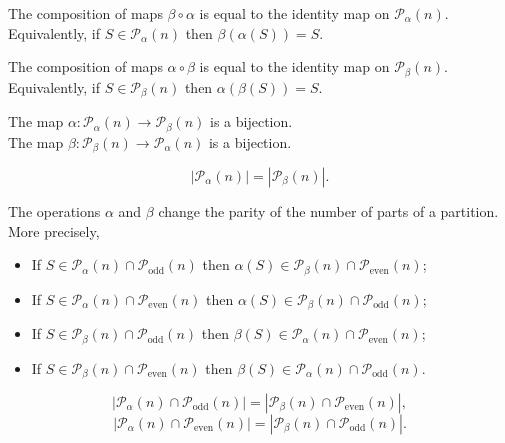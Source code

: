 \begin{lemma} \leanok
  The composition of maps $\beta\circ\alpha$ is equal to the identity map on  $\mathcal{P}_\alpha(n)$. Equivalently, if $S\in \mathcal{P}_\alpha(n)$ then $\beta(\alpha(S))=S$.
\end{lemma}

\begin{lemma} \leanok
  The composition of maps $\alpha\circ\beta$ is equal to the identity map on  $\mathcal{P}_\beta(n)$. Equivalently, if $S\in \mathcal{P}_\beta(n)$ then $\alpha(\beta(S))=S$.
\end{lemma}

\begin{lemma} \leanok
The map $\alpha: \mathcal{P}_\alpha(n)\to \mathcal{P}_\beta(n)$ is a bijection. \\
The map $\beta: \mathcal{P}_\beta(n)\to \mathcal{P}_\alpha(n)$ is a bijection.
\end{lemma}

\begin{lemma} \leanok
$$\left| \mathcal{P}_\alpha(n)\right|=\left|\mathcal{P}_\beta(n) \right|.$$
\end{lemma}

\begin{lemma} \leanok
The operations $\alpha$ and $\beta$ change the parity of the number of parts of a partition. More precisely,
\begin{itemize}
\item If $S\in \mathcal{P}_\alpha(n)\cap\mathcal{P}_{\mathrm{odd}}(n) $ then  $\alpha(S) \in \mathcal{P}_\beta(n)\cap\mathcal{P}_{\mathrm{even}}(n) $;
\item If $S\in \mathcal{P}_\alpha(n)\cap\mathcal{P}_{\mathrm{even}}(n) $ then  $\alpha(S) \in \mathcal{P}_\beta(n)\cap\mathcal{P}_{\mathrm{odd}}(n) $;
\item If $S\in \mathcal{P}_\beta(n)\cap\mathcal{P}_{\mathrm{odd}}(n) $ then  $\beta(S) \in \mathcal{P}_\alpha(n)\cap\mathcal{P}_{\mathrm{even}}(n) $;
\item If $S\in \mathcal{P}_\beta(n)\cap\mathcal{P}_{\mathrm{even}}(n) $ then  $\beta(S) \in \mathcal{P}_\alpha(n)\cap\mathcal{P}_{\mathrm{odd}}(n) $.
\end{itemize}
\end{lemma}

\begin{lemma}\label{lemma: alpha odd eq beta even} \leanok
$$\left| \mathcal{P}_\alpha(n)\cap \mathcal{P}_{\mathrm{odd}}(n)\right|=\left| \mathcal{P}_\beta(n)\cap \mathcal{P}_{\mathrm{even}}(n)\right|,$$
$$\left| \mathcal{P}_\alpha(n)\cap \mathcal{P}_{\mathrm{even}}(n)\right|=\left| \mathcal{P}_\beta(n)\cap \mathcal{P}_{\mathrm{odd}}(n)\right|.$$
\end{lemma}



